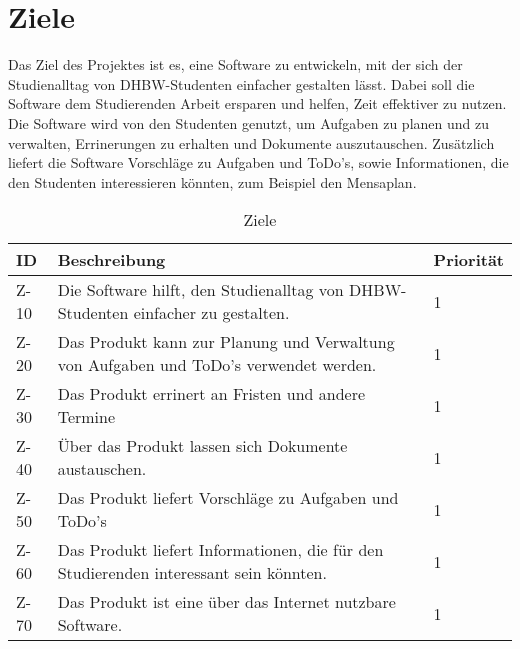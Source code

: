 
\chapter{Ziele}
Das Ziel des Projektes ist es, eine Software zu entwickeln, mit der sich der Studienalltag von DHBW-Studenten einfacher gestalten lässt. Dabei soll die Software dem Studierenden Arbeit ersparen und helfen, Zeit effektiver zu nutzen. Die Software wird von den Studenten genutzt, um  Aufgaben zu planen und zu verwalten, Errinerungen zu erhalten und Dokumente auszutauschen. Zusätzlich liefert die Software Vorschläge zu Aufgaben und ToDo's, sowie Informationen, die den Studenten interessieren könnten, zum Beispiel den Mensaplan. 

\begin{table}[H]
\caption{Ziele}
\label{ziele:entwicklungsziele}
\begin{tabularx}{\textwidth}{|l|X|l|}
\toprule
\textbf{ID} & \textbf{Beschreibung} & \textbf{Priorität}\\
\endhead
\hline
Z-10 & Die Software hilft, den Studienalltag von DHBW-Studenten einfacher zu gestalten. & 1 \\
Z-20 & Das Produkt kann zur Planung und Verwaltung von Aufgaben und ToDo's verwendet werden. & 1 \\
Z-30 & Das Produkt errinert an Fristen und andere Termine  & 1 \\
Z-40 & Über das Produkt lassen sich Dokumente austauschen. & 1 \\
Z-50 & Das Produkt liefert Vorschläge zu Aufgaben und ToDo's & 1 \\
Z-60 & Das Produkt liefert Informationen, die für den Studierenden interessant sein könnten. & 1 \\
Z-70 & Das Produkt ist eine über das Internet nutzbare Software. & 1\\
\hline
\end{tabularx}
\end{table}
